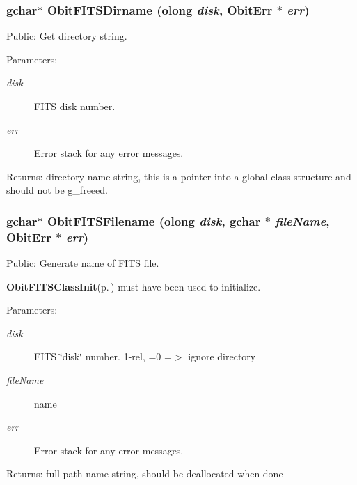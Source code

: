 \subsubsection{\setlength{\rightskip}{0pt plus 5cm}gchar$\ast$ Obit\-FITSDirname ({\bf olong} {\em disk}, {\bf Obit\-Err} $\ast$ {\em err})}\label{ObitFITS_8c_a8}


Public: Get directory string. 

\begin{Desc}
\item[Parameters:]
\begin{description}
\item[{\em disk}]FITS disk number. \item[{\em err}]Error stack for any error messages. \end{description}
\end{Desc}
\begin{Desc}
\item[Returns:]directory name string, this is a pointer into a global class structure and should not be g\_\-freeed. \end{Desc}
\subsubsection{\setlength{\rightskip}{0pt plus 5cm}gchar$\ast$ Obit\-FITSFilename ({\bf olong} {\em disk}, gchar $\ast$ {\em file\-Name}, {\bf Obit\-Err} $\ast$ {\em err})}\label{ObitFITS_8c_a7}


Public: Generate name of FITS file. 

{\bf Obit\-FITSClass\-Init}{\rm (p.\,\pageref{ObitFITS_8c_a2})} must have been used to initialize. \begin{Desc}
\item[Parameters:]
\begin{description}
\item[{\em disk}]FITS \char`\"{}disk\char`\"{} number. 1-rel, =0 =$>$ ignore directory \item[{\em file\-Name}]name \item[{\em err}]Error stack for any error messages. \end{description}
\end{Desc}
\begin{Desc}
\item[Returns:]full path name string, should be deallocated when done \end{Desc}
